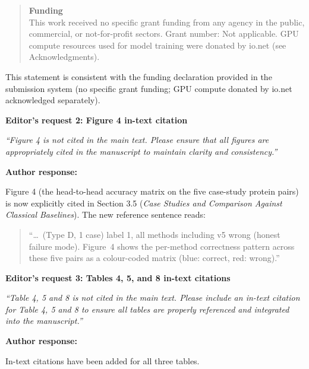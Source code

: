 \documentclass[11pt]{article}
\begin{document}
\begin{quote}
\small
\textbf{Funding}\\
This work received no specific grant funding from any agency in the public, commercial, or not-for-profit sectors. Grant number: Not applicable. GPU compute resources used for model training were donated by io.net (see Acknowledgments).
\end{quote}

This statement is consistent with the funding declaration provided in the submission system (no specific grant funding; GPU compute donated by io.net acknowledged separately).

\vspace{1em}

\textbf{\color{editorblue}Editor's request 2: Figure 4 in-text citation}

\textit{``Figure 4 is not cited in the main text. Please ensure that all figures are appropriately cited in the manuscript to maintain clarity and consistency.''}

\textbf{\color{authorgreen}Author response:}

Figure 4 (the head-to-head accuracy matrix on the five case-study protein pairs) is now explicitly cited in Section 3.5 (\emph{Case Studies and Comparison Against Classical Baselines}). The new reference sentence reads:

\begin{quote}
\small
``\ldots\ (Type D, 1 case) label 1, all methods including v5 wrong (honest failure mode). Figure~4 shows the per-method correctness pattern across these five pairs as a colour-coded matrix (blue: correct, red: wrong).''
\end{quote}

\vspace{1em}

\textbf{\color{editorblue}Editor's request 3: Tables 4, 5, and 8 in-text citations}

\textit{``Table 4, 5 and 8 is not cited in the main text. Please include an in-text citation for Table 4, 5 and 8 to ensure all tables are properly referenced and integrated into the manuscript.''}

\textbf{\color{authorgreen}Author response:}

In-text citations have been added for all three tables.
\end{document}
